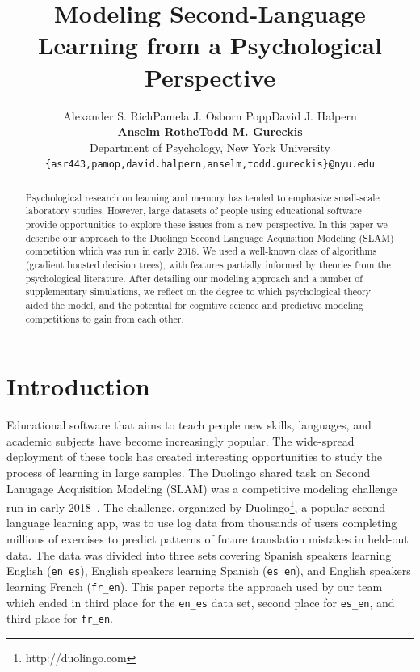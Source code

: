 \documentclass[11pt,a4paper]{article}
\title{Modeling Second-Language Learning from a Psychological Perspective}
\author{Alexander S. Rich\qquad Pamela J. Osborn Popp\qquad David J. Halpern\\
  \textbf{Anselm Rothe\qquad Todd M. Gureckis} \\
  Department of Psychology, New York University \\
  {\tt \{asr443,pamop,david.halpern,anselm,todd.gureckis\}@nyu.edu} \\}
\date{}
\begin{document}
\maketitle
\begin{abstract}
Psychological research on learning and memory
has tended to emphasize small-scale laboratory
studies.  However, large datasets of people using 
educational software provide opportunities to explore
these issues from a new perspective.  In this paper we
describe our approach to the Duolingo Second Language
Acquisition Modeling (SLAM) competition which was run in
early 2018.  We used a well-known class of algorithms (gradient boosted decision
trees), with features partially informed by theories from the psychological
literature. After detailing our modeling approach and a number of
supplementary simulations, we
reflect on the degree to which psychological theory aided the model, and
the potential for cognitive science and predictive modeling competitions to gain
from each other.
\end{abstract}

\section{Introduction}

Educational software that aims to teach people new skills, languages, and
academic subjects have become increasingly popular.  The wide-spread
deployment of these tools has created interesting opportunities to study
the process of learning in large samples. The Duolingo shared task on Second Lanugage Acquisition Modeling (SLAM)
was a competitive modeling challenge run in early 2018~\cite{slam18}.
The challenge, organized by Duolingo\footnote{http://duolingo.com}, a popular second
language learning app, was
to use log data from thousands of users completing millions of exercises to 
predict patterns of future translation mistakes in held-out data.  The data was
divided into three sets covering Spanish speakers learning English ({\tt en\_es}),
English speakers learning Spanish ({\tt es\_en}), and English speakers learning
French ({\tt fr\_en}).
This paper reports the approach used by our team which ended in third place 
for the {\tt en\_es} data set, second place for {\tt es\_en}, and third place
for {\tt fr\_en}.
\end{document}
